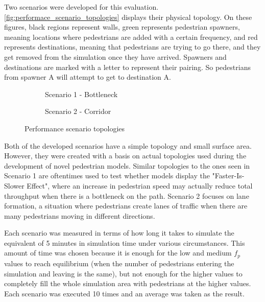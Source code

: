 \documentclass[twoside, 11pt]{article}
\begin{document}
Two scenarios were developed for this evaluation. \autoref{fig:performace_scenario_topologies} displays their physical topology. On these figures, black regions represent walls, green represents pedestrian spawners, meaning locations where pedestrians are added with a certain frequency, and red represents destinations, meaning that pedestrians are trying to go there, and they get removed from the simulation once they have arrived. Spawners and destinations are marked with a letter to represent their pairing. So pedestrians from spawner A will attempt to get to destination A.

\begin{figure}[h]
  \centering
  \begin{subfigure}{.33\textwidth}
    \centering
    
    \caption{Scenario 1 -  Bottleneck}
    \label{fig:sfig1}
  \end{subfigure}%
  \begin{subfigure}{.67\textwidth}
    \centering
    
    \caption{Scenario 2 - Corridor}
    \label{fig:sfig1}
  \end{subfigure}%
  \caption{Performance scenario topologies}
  \label{fig:performace_scenario_topologies}
\end{figure}

Both of the developed scenarios have a simple topology and small surface area. However, they were created with a basis on actual topologies used during the development of novel pedestrian models. Similar topologies to the ones seen in Scenario 1 are oftentimes used to test whether models display the "Faster-Is-Slower Effect", where an increase in pedestrian speed may actually reduce total throughput when there is a bottleneck on the path. Scenario 2 focuses on lane formation, a situation where pedestrians create lanes of traffic when there are many pedestrians moving in different directions.

Each scenario was measured in terms of how long it takes to simulate the equivalent of 5 minutes in simulation time under various circumstances. This amount of time was chosen because it is enough for the low and medium $f_p$ values to reach equilibrium (when the number of pedestrians entering the simulation and leaving is the same), but not enough for the higher values to completely fill the whole simulation area with pedestrians at the higher values. Each scenario was executed 10 times and an average was taken as the result.
\end{document}
